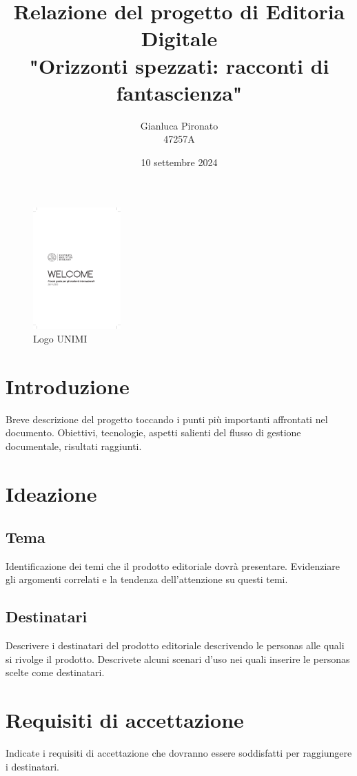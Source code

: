 \documentclass[a4paper,12pt]{article}
\title{Relazione del progetto di Editoria Digitale \\ "Orizzonti spezzati: racconti di fantascienza"}
\author{Gianluca Pironato \\ 47257A}
\date{10 settembre 2024}
\begin{document}
\clearpage\maketitle
\thispagestyle{empty}

\begin{figure}[h]
    \centering
    \includegraphics[width=0.3\textwidth]{unimi.pdf} %
    \caption{Logo UNIMI}
\end{figure}

\newpage

\setcounter{page}{1}

\section*{Introduzione}
Breve descrizione del progetto toccando i punti più importanti affrontati nel documento. Obiettivi, tecnologie, aspetti salienti del flusso di gestione documentale, risultati raggiunti.

\section*{Ideazione}
\subsection*{Tema}
Identificazione dei temi che il prodotto editoriale dovrà presentare. Evidenziare gli argomenti correlati e la tendenza dell’attenzione su questi temi.

\subsection*{Destinatari}
Descrivere i destinatari del prodotto editoriale descrivendo le personas alle quali si rivolge il prodotto. Descrivete alcuni scenari d’uso nei quali inserire le personas scelte come destinatari.


\section*{Requisiti di accettazione}
Indicate i requisiti di accettazione che dovranno essere soddisfatti per raggiungere i destinatari. 
\end{document}
